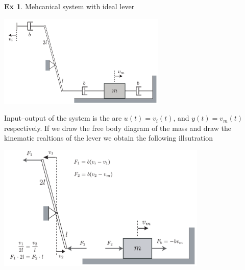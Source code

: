 \documentclass[twoside]{article}
\theoremstyle{definition}
\newtheorem{exmp}[theorem]{Ex}
\begin{document}

\newpage

\begin{exmp}
Mehcanical system with ideal lever
\end{exmp}
 
 \vspace{-30pt}
  
\begin{minipage}[h]{1\linewidth}
    \begin{center}
      \includegraphics[width=0.6\textwidth]{leverideal}
    \end{center}
\end{minipage}   

\vspace{6pt}

Input--output of the system is the are $u(t) = v_i(t)$, and
$y(t) = v_m(t)$ respectively. If we draw the free body diagram of
the mass and draw the kinematic realtions of the lever we 
obtain the following illsutration

\vspace{6pt}
  
\begin{minipage}[h]{1\linewidth}
    \begin{center}
      \includegraphics[width=0.75\textwidth]{leverideal_solution}
    \end{center}
\end{minipage}   

\vspace{6pt}
\end{document}
